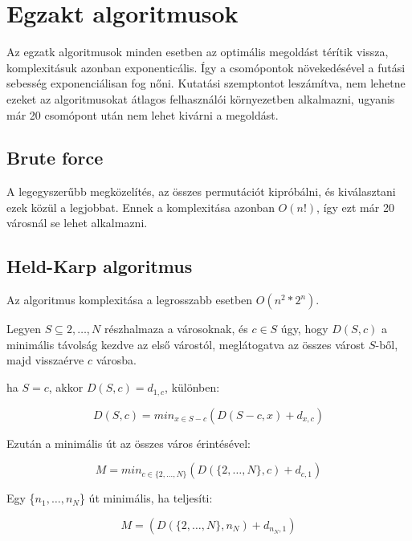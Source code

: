 \section{Egzakt algoritmusok}\label{sec:ALAP:adatelem}

Az egzatk algoritmusok minden esetben az optimális megoldást térítik vissza, komplexitásuk azonban exponenticális. Így a csomópontok növekedésével a futási sebesség exponenciálisan fog nőni. Kutatási szemptontot leszámítva, nem lehetne ezeket az algoritmusokat átlagos felhasználói környezetben alkalmazni, ugyanis már 20 csomópont után nem lehet kivárni a megoldást. 

\subsection{Brute force}

A legegyszerűbb megközelítés, az összes permutációt kipróbálni, és kiválasztani ezek közül a legjobbat. Ennek a komplexitása azonban \(O(n!)\), így ezt már 20 városnál se lehet alkalmazni.


\subsection{Held-Karp algoritmus}

Az algoritmus komplexitása a legrosszabb esetben \(O(n^2*2^n)\).

Legyen \(S \subseteq {2, \dots, N}\) részhalmaza a városoknak, és \(c \in S\) úgy, hogy \(D(S,c)\) a minimális távolság kezdve az első várostól, meglátogatva az összes várost \(S\)-ből, majd visszaérve \(c\) városba.

ha \(S = {c}\), akkor \(D(S,c) = d_{1,c}\), különben:

\begin{equation}
D(S,c) = min_{x \in S-c}(D(S - c,x)+d_{x,c})
\end{equation}

Ezután a minimális út az összes város érintésével:

\begin{equation}
M = min_{c \in \{2, \dots, N\}}(D(\{2, \dots, N\}, c)+d_{c, 1})
\end{equation}

Egy \{\(n_1, \dots, n_N\)\} út minimális, ha teljesíti:

\begin{equation}
M = (D(\{2, \dots, N\}, n_N)+d_{n_N, 1})
\end{equation}

